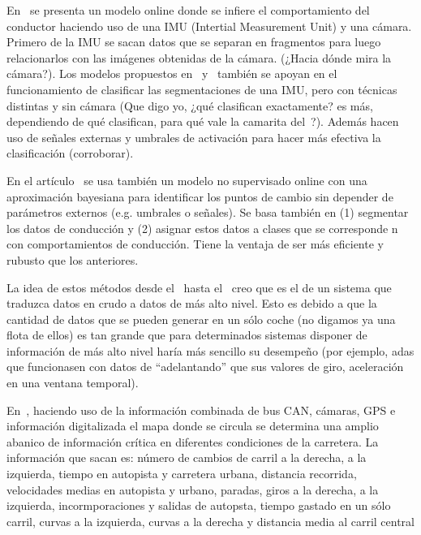 En~\cite{maye2011bayesian} se presenta un modelo online donde se infiere el comportamiento del conductor haciendo uso de una IMU (Intertial Measurement Unit) y una cámara. Primero de la IMU se sacan datos que se separan en fragmentos para luego relacionarlos con las imágenes obtenidas de la cámara. (\TODO ¿Hacia dónde mira la cámara?). Los modelos propuestos en~\cite{johnson2011driving} y~\cite{van2013driver} también se apoyan en el funcionamiento de clasificar las segmentaciones de una IMU, pero con técnicas distintas y sin cámara (\TODO Que digo yo, ¿qué clasifican exactamente? es más, dependiendo de qué clasifican, para qué vale la camarita del~\cite{maye2011bayesian}?). Además hacen uso de señales externas y umbrales de activación para hacer más efectiva la clasificación (\TODO corroborar).

En el artículo~\cite{bender2015unsupervised} se usa también un modelo no supervisado online con una aproximación bayesiana para identificar los puntos de cambio sin depender de parámetros externos (e.g. umbrales o señales). Se basa también en (1) segmentar los datos de conducción y (2) asignar estos datos a clases que se corresponde n con comportamientos de conducción. Tiene la ventaja de ser más eficiente y rubusto que los anteriores.

La idea de estos métodos desde el~\cite{sekizawa2007modeling} hasta el~\cite{bender2015unsupervised} creo que es el de un sistema que traduzca datos en crudo a datos de más alto nivel. Esto es debido a que la cantidad de datos que se pueden generar en un sólo coche (no digamos ya una flota de ellos) es tan grande que para determinados sistemas disponer de información de más alto nivel haría más sencillo su desempeño (por ejemplo, \gls{adas} que funcionasen con datos de \enquote{adelantando} que sus valores de giro, aceleración en una ventana temporal).

En~\cite{satzoda2013towards}, haciendo uso de la información combinada de bus CAN, cámaras, GPS e información digitalizada el mapa donde se circula se determina una amplio abanico de información crítica en diferentes condiciones de la carretera. La información que sacan es: número de cambios de carril a la derecha, a la izquierda, tiempo en autopista y carretera urbana, distancia recorrida, velocidades medias en autopista y urbano, paradas, giros a la derecha, a la izquierda, incormporaciones y salidas de autopsta, tiempo gastado en un sólo carril, curvas a la izquierda, curvas a la derecha y distancia media al carril central

